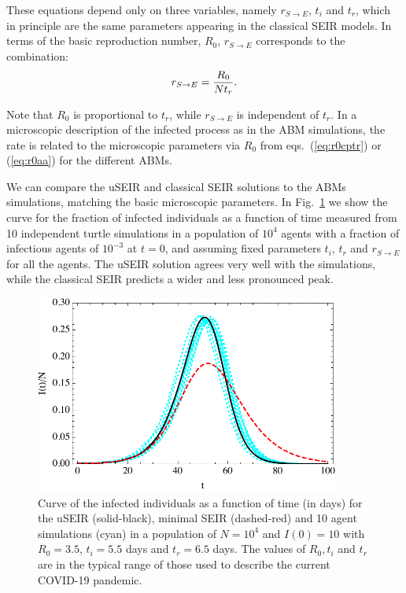 \documentclass[10pt,letterpaper]{article}
\begin{document}
These equations depend only on three variables, namely $r_{S\rightarrow E}$, $t_i$ and $t_r$, which in principle are the same parameters appearing in the classical SEIR models. In terms of the 
basic reproduction number, $R_0$, $r_{S\rightarrow E}$ corresponds to the combination:
\begin{eqnarray}
r_{S\rightarrow E} = {R_0\over N t_r}.
\end{eqnarray}

Note that $R_0$ is proportional to $t_r$, while $r_{S\rightarrow E}$ is independent of $t_r$. In a microscopic description of the infected process as in the ABM simulations, the rate is related to the microscopic parameters via $R_0$ from eqs.~(\ref{eq:r0cptr}) or (\ref{eq:r0aa})  for the different ABMs.

  We can compare the uSEIR and classical SEIR solutions to the ABMs simulations, matching the basic microscopic parameters. 
In Fig.~\ref{fig:fixed} we show the curve for the fraction of infected individuals as a function of time measured from 10 independent turtle simulations in a population of $10^4$ agents with a fraction of infectious agents of $10^{-3}$ at $t=0$, and assuming fixed parameters $t_i$, $t_r$ and $r_{S\rightarrow E}$ for all the agents. The uSEIR solution agrees very well with the simulations, while the classical SEIR predicts a wider and less pronounced peak.

\begin{figure}[h!]
  \centering
  \includegraphics[width=10cm]{fixedraw.pdf}
  \caption{ Curve of the infected individuals as a function of time (in days) for the uSEIR (solid-black), minimal SEIR (dashed-red) and 10 agent simulations (cyan) in a  population of $N=10^4$ and $I(0)=10$ with $R_0=3.5$, $t_i=5.5$ days and $t_r=6.5$ days.  The values of $R_0, t_i$ and $t_r$ are in the typical range of those used to describe the
  current COVID-19 pandemic. }
  \label{fig:fixed}
   \end{figure}
\end{document}
